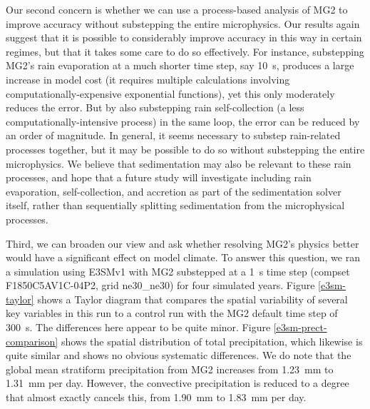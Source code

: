 \documentclass [11pt, proquest] {uwthesis}[2020/02/24]
\begin{document}
Our second concern is whether we can use a process-based analysis of MG2 to improve accuracy without substepping the entire microphysics. Our results again suggest that it is possible to considerably improve accuracy in this way in certain regimes, but that it takes some care to do so effectively. For instance, substepping MG2's rain evaporation at a much shorter time step, say \SI{10}{\second}, produces a large increase in model cost (it requires multiple calculations involving computationally-expensive exponential functions), yet this only moderately reduces the error. But by also substepping rain self-collection (a less computationally-intensive process) in the same loop, the error can be reduced by an order of magnitude. In general, it seems necessary to substep rain-related processes together, but it may be possible to do so without substepping the entire microphysics. We believe that sedimentation may also be relevant to these rain processes, and hope that a future study will investigate including rain evaporation, self-collection, and accretion as part of the sedimentation solver itself, rather than sequentially splitting sedimentation from the microphysical processes.

Third, we can broaden our view and ask whether resolving MG2's physics better would have a significant effect on model climate. To answer this question, we ran a simulation using E3SMv1 with MG2 substepped at a \SI{1}{\second} time step (compset F1850C5AV1C-04P2, grid ne30\_ne30) for four simulated years. Figure \ref{e3sm-taylor} shows a Taylor diagram \parencite{Taylor2001} that compares the spatial variability of several key variables in this run to a control run with the MG2 default time step of \SI{300}{\second}. The differences here appear to be quite minor. Figure \ref{e3sm-prect-comparison} shows the spatial distribution of total precipitation, which likewise is quite similar and shows no obvious systematic differences. We do note that the global mean stratiform precipitation from MG2 increases from \SI{1.23}{\milli\meter} to \SI{1.31}{\milli\meter} per day. However, the convective precipitation is reduced to a degree that almost exactly cancels this, from \SI{1.90}{\milli\meter} to \SI{1.83}{\milli\meter} per day.
\end{document}
